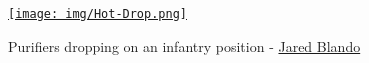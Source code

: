 \begin{figure}[!h]
  \centering
  \href{https://jaredblando.com/}{\texttt{[image: img/Hot-Drop.png]}}
  \caption*{Purifiers dropping on an infantry position - \href{https://jaredblando.com/}{Jared Blando}}
\end{figure}
